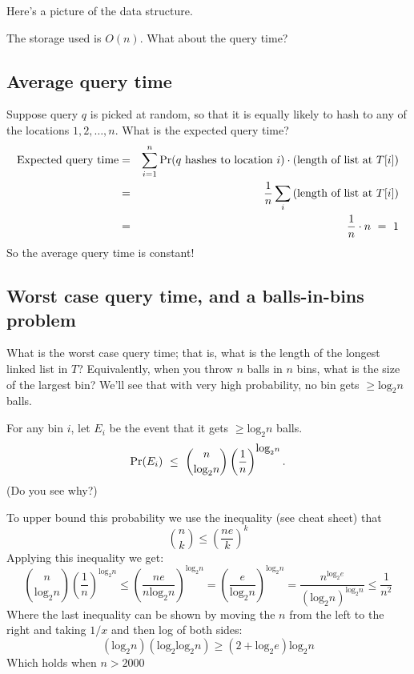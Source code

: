 \documentclass{report}
\theoremstyle{plain}
\theoremstyle{definition}
\newcommand{\pr}{\mbox{\rm Pr}}
\begin{document}
Here's a picture of the data structure.

\begin{center}
\end{center}

The storage used is $O(n)$. What about the query time?

\subsection{Average query time}

Suppose query $q$ is picked at random, so that it is equally likely to hash to
any of the locations $1,2,\ldots, n$. What is the expected query time?
\begin{eqnarray*}
\mbox{Expected query time}
& =& 
\sum_{i=1}^n \pr(\mbox{$q$ hashes to location $i$}) \cdot \mbox{(length of list at $T[i]$)} \\
& =&
\frac{1}{n} \sum_i  \mbox{(length of list at $T[i]$)} \\ 
& = & 
\frac{1}{n} \cdot n \ = \ 1
\end{eqnarray*}
So the average query time is constant!

\subsection{Worst case query time, and a balls-in-bins problem}
\renewcommand{\log}{\mbox{log}_2}

What is the worst case query time; that is, what is the length of the longest linked list
in $T$? Equivalently, when you throw $n$ balls in $n$ bins, what is the size of the 
largest bin? We'll see that with very high probability, no bin gets $\geq \log n$
balls.

For any bin $i$, let $E_i$ be the event that it gets $\geq \log n$ balls.
$$ \pr(E_i) \  \leq \ {n \choose \log n} \left( \frac{1}{n} \right)^{\log n} .$$
(Do you see why?) 

To upper bound this probability we use the inequality (see cheat sheet) that
\[
{n \choose k} \leq \left( \frac{ne}{k} \right)^k
\]
Applying this inequality we get:
\[
{n \choose \log n} \left( \frac{1}{n} \right)^{\log n} \leq 
\left( \frac{ne}{n \log n}  \right)^{\log n} =
\left( \frac{e}{\log n}  \right)^{\log n} =
\frac{n^{\log e}}{(\log n)^{\log n}} \leq \frac{1}{n^2}
\]
Where the last inequality can be shown by moving the $n$ from the left
to the right and taking $1/x$ and then log of both sides:
\[
(\log n)(\log \log n) \geq (2+\log e) \log n
\]
Which holds when $n>2000$
\end{document}
